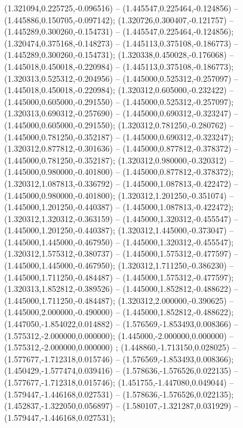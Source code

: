  (1.321094,0.225725,-0.096516) -- (1.445547,0.225464,-0.124856) -- (1.445886,0.150705,-0.097142);
 (1.320726,0.300407,-0.121757) -- (1.445289,0.300260,-0.154731) -- (1.445547,0.225464,-0.124856);
 (1.320474,0.375168,-0.148273) -- (1.445113,0.375108,-0.186773) -- (1.445289,0.300260,-0.154731);
 (1.320338,0.450028,-0.176068) -- (1.445018,0.450018,-0.220984) -- (1.445113,0.375108,-0.186773);
 (1.320313,0.525312,-0.204956) -- (1.445000,0.525312,-0.257097) -- (1.445018,0.450018,-0.220984);
 (1.320312,0.605000,-0.232422) -- (1.445000,0.605000,-0.291550) -- (1.445000,0.525312,-0.257097);
 (1.320313,0.690312,-0.257690) -- (1.445000,0.690312,-0.323247) -- (1.445000,0.605000,-0.291550);
 (1.320312,0.781250,-0.280762) -- (1.445000,0.781250,-0.352187) -- (1.445000,0.690312,-0.323247);
 (1.320312,0.877812,-0.301636) -- (1.445000,0.877812,-0.378372) -- (1.445000,0.781250,-0.352187);
 (1.320312,0.980000,-0.320312) -- (1.445000,0.980000,-0.401800) -- (1.445000,0.877812,-0.378372);
 (1.320312,1.087813,-0.336792) -- (1.445000,1.087813,-0.422472) -- (1.445000,0.980000,-0.401800);
 (1.320312,1.201250,-0.351074) -- (1.445000,1.201250,-0.440387) -- (1.445000,1.087813,-0.422472);
 (1.320312,1.320312,-0.363159) -- (1.445000,1.320312,-0.455547) -- (1.445000,1.201250,-0.440387);
 (1.320312,1.445000,-0.373047) -- (1.445000,1.445000,-0.467950) -- (1.445000,1.320312,-0.455547);
 (1.320312,1.575312,-0.380737) -- (1.445000,1.575312,-0.477597) -- (1.445000,1.445000,-0.467950);
 (1.320312,1.711250,-0.386230) -- (1.445000,1.711250,-0.484487) -- (1.445000,1.575312,-0.477597);
 (1.320313,1.852812,-0.389526) -- (1.445000,1.852812,-0.488622) -- (1.445000,1.711250,-0.484487);
 (1.320312,2.000000,-0.390625) -- (1.445000,2.000000,-0.490000) -- (1.445000,1.852812,-0.488622);
 (1.447050,-1.854022,0.014882) -- (1.576569,-1.853493,0.008366) -- (1.575312,-2.000000,0.000000);
 (1.445000,-2.000000,0.000000) -- (1.575312,-2.000000,0.000000) ;
 (1.448860,-1.713150,0.028025) -- (1.577677,-1.712318,0.015746) -- (1.576569,-1.853493,0.008366);
 (1.450429,-1.577474,0.039416) -- (1.578636,-1.576526,0.022135) -- (1.577677,-1.712318,0.015746);
 (1.451755,-1.447080,0.049044) -- (1.579447,-1.446168,0.027531) -- (1.578636,-1.576526,0.022135);
 (1.452837,-1.322050,0.056897) -- (1.580107,-1.321287,0.031929) -- (1.579447,-1.446168,0.027531);
